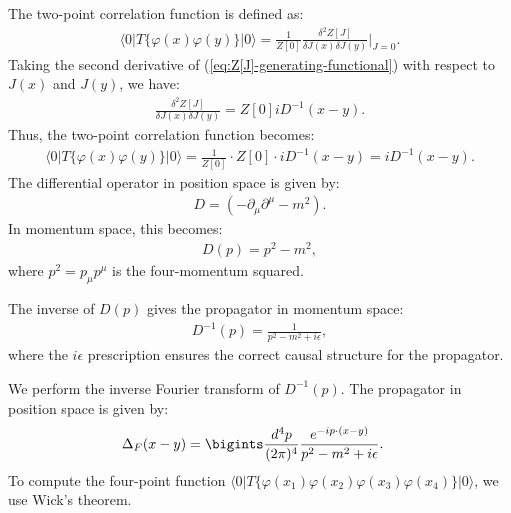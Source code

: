 The two-point correlation function is defined as:
\begin{align}
    \langle 0 | T \{ \varphi(x) \varphi(y) \} | 0 \rangle = \frac{1}{Z[0]} \frac{\delta^2 Z[J]}{\delta J(x) \delta J(y)} \bigg|_{J=0}.
\end{align}
Taking the second derivative of (\ref{eq:Z[J]-generating-functional}) with respect to $J(x)$ and $J(y)$, we have:
\begin{align*}
    \frac{\delta^2 Z[J]}{\delta J(x) \delta J(y)} = Z[0]i D^{-1}(x - y). 
\end{align*}
Thus, the two-point correlation function becomes:
\begin{align}
    \langle 0 | T \{ \varphi(x) \varphi(y) \} | 0 \rangle = \frac{1}{Z[0]} \cdot Z[0] \cdot i D^{-1}(x - y) = i D^{-1}(x - y).
\end{align}
The differential operator in position space is given by:
\begin{align*}
    D = \left( -\partial_\mu \partial^\mu - m^2 \right).
\end{align*}
In momentum space, this becomes:
\begin{align*}
    D(p) = p^2 - m^2,
\end{align*}
where $p^2 = p_\mu p^\mu$ is the four-momentum squared.

The inverse of $D(p)$ gives the propagator in momentum space:
\begin{align}
    D^{-1}(p) = \frac{1}{p^2 - m^2 + i\epsilon},
\end{align}
where the $i\epsilon$ prescription ensures the correct causal structure for the propagator.

We perform the inverse Fourier transform of $D^{-1}(p)$. The propagator in position space is given by:
\begin{align}
    \Delta_F(x - y) &= \bigints \frac{d^4 p}{(2\pi)^4} \frac{e^{-ip \cdot (x - y)}}{p^2 - m^2 + i\epsilon}.\label{eq:feynmann-propagator-momentum-space}
\end{align}
To compute the four-point function $\langle 0 | T \{ \varphi(x_1) \varphi(x_2) \varphi(x_3) \varphi(x_4) \} | 0 \rangle$, we use Wick's theorem. 

